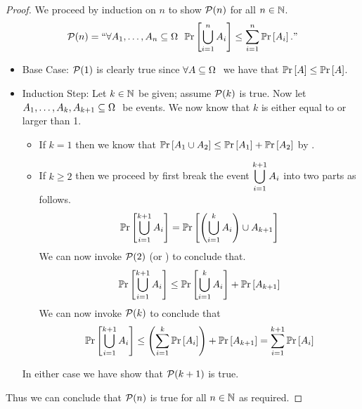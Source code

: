         \begin{proof}
            We proceed by induction on $n$ to show $\mathcal{P}(n)$ for all $n \in \mathbb{N}$.
            \[
                \mathcal{P}(n) = ``\forall A_1, \dots, A_n \subseteq \Omega \  \
                                     \mathbb{P}\mathrm{r} \left[\displaystyle\bigcup_{i = 1}^{n} A_i\right] \le \sum_{i = 1}^{n} \mathbb{P}\mathrm{r} \left[A_i\right]."
            \]
            \begin{itemize}
                \item
                    Base Case: $\mathcal{P}(1)$ is clearly true since $\forall A \subseteq \Omega \ $
                    we have that $\mathbb{P}\mathrm{r} \left[A\right] \le \mathbb{P}\mathrm{r} \left[A\right]$.
                \item
                    Induction Step: Let $k \in \mathbb{N}$ be given; assume $\mathcal{P}(k)$ is true.
                    Now let $A_1, \dots, A_k, A_{k + 1} \subseteq \Omega \ $ be events. We now know that
                    $k$ is either equal to or larger than 1.
                    \begin{itemize}
                        \item
                            If $k = 1$ then we know that $\mathbb{P}\mathrm{r} \left[A_1 \cup A_2\right] \le \mathbb{P}\mathrm{r} \left[A_1\right] + \mathbb{P}\mathrm{r} \left[A_2\right]$
                            by \CorollaryRef{Union Bound n = 2}.
                        \item
                            If $k \ge 2$ then we proceed by first break the event $\displaystyle\bigcup_{i = 1}^{k + 1} A_i$
                            into two parts as follows.
                            \[
                                \mathbb{P}\mathrm{r} \left[\displaystyle\bigcup_{i = 1}^{k + 1} A_i\right] = 
                                \mathbb{P}\mathrm{r} \left[\left(\displaystyle\bigcup_{i = 1}^{k} A_i\right) \cup A_{k + 1}\right]
                            \]
                            We can now invoke $\mathcal{P}(2)$ (or ) to
                            conclude that.
                            \[
                                \mathbb{P}\mathrm{r} \left[\displaystyle\bigcup_{i = 1}^{k + 1} A_i\right] \le
                                \mathbb{P}\mathrm{r} \left[\displaystyle\bigcup_{i = 1}^{k} A_i\right] + \mathbb{P}\mathrm{r} \left[A_{k + 1}\right]
                            \]
                            We can now invoke $\mathcal{P}(k)$ to conclude that
                            \[
                                \mathbb{P}\mathrm{r} \left[\displaystyle\bigcup_{i = 1}^{k + 1} A_i\right] \le
                                \left(\sum_{i = 1}^{k} \mathbb{P}\mathrm{r} \left[A_i\right]\right) + \mathbb{P}\mathrm{r} \left[A_{k + 1}\right] = \sum_{i = 1}^{k + 1} \mathbb{P}\mathrm{r} \left[A_i\right]
                            \]
                    \end{itemize}
                    In either case we have show that $\mathcal{P}(k + 1)$ is true.
            \end{itemize}
            Thus we can conclude that $\mathcal{P}(n)$ is true for all $n \in \mathbb{N}$
            as required. \QED
        \end{proof}
